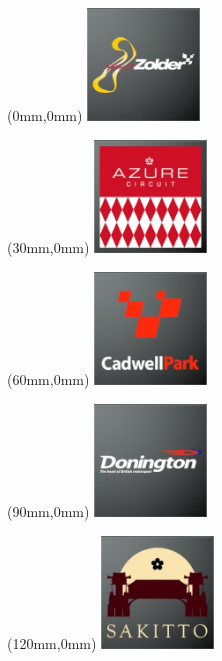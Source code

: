 \begin{textblock*}{30mm}(0mm,0mm)%
\includegraphics[width=30mm]{LG/2015-05-20_00100.png}
\end{textblock*}
\begin{textblock*}{30mm}(30mm,0mm)%
\includegraphics[width=30mm]{LG/2015-05-20_00072.png}
\end{textblock*}
\begin{textblock*}{30mm}(60mm,0mm)%
\includegraphics[width=30mm]{LG/2015-05-20_00076.png}
\end{textblock*}
\begin{textblock*}{30mm}(90mm,0mm)%
\includegraphics[width=30mm]{LG/2015-05-20_00080.png}
\end{textblock*}
\begin{textblock*}{30mm}(120mm,0mm)%
\includegraphics[width=30mm]{LG/2015-05-20_00093.png}
\end{textblock*}
